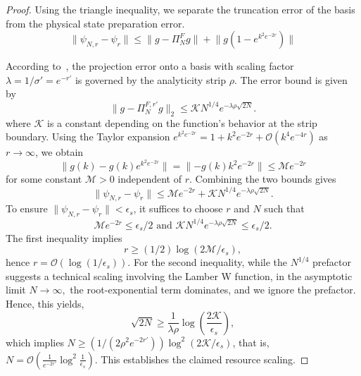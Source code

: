 \documentclass{article}
\begin{document}
\begin{proof}
    Using the triangle inequality, we separate the truncation error of the basis from the physical state preparation error.
    $$\lVert \psi_{N,r} -\psi_r\rVert\leq \lVert g - \Pi_N^F g\rVert + \lVert g(1- e^{k^2 e^{-2r}})\rVert$$
    
    According to~\cite[Thm.~3.8 \& Sec.~5.2]{wang2025convergenceanalysishermiteapproximations}, the projection error onto a basis with scaling factor $\lambda=1/\sigma'=e^{-r'}$ is governed by the analyticity strip $\rho$. The error bound is given by
    \[
    \lVert g - \Pi^{F,r'}_N g \rVert_2 \leq \mathcal{K} N^{1/4} e^{-\lambda\rho \sqrt{2N}}.
    \]
    where $\mathcal{K}$ is a constant depending on the function's behavior at the strip boundary. 
    Using the Taylor expansion $e^{k^2 e^{-2r}} = 1 + k^2 e^{-2r} + \mathcal O(k^4 e^{-4r})$ as $r\to\infty$, we obtain 
        $$\lVert g(k)-g(k)e^{k^2e^{-2r}}\rVert=\lVert-g(k)k^2e^{-2r}\rVert\leq\mathcal{M}e^{-2r}$$ 
    for some constant $\mathcal M > 0$ independent of $r$.
    Combining the two bounds gives $$\lVert \psi_{N,r} -\psi_r\rVert \leq \mathcal{M} e^{-2r} + \mathcal{K} N^{1/4}e^{-\lambda\rho \sqrt{2N}}.$$ 
    To ensure $\lVert \psi_{N,r} - \psi_r\rVert < \epsilon_s$, it suffices to choose $r$ and $N$ such that
        $$\mathcal{M} e^{-2r} \leq \epsilon_s/2 \text{ and } \mathcal{K} N^{1/4} e^{-\lambda\rho \sqrt{2N}} \leq \epsilon_s/2.$$
    The first inequality implies 
        $$r \geq (1/2)\log(2\mathcal M/\epsilon_s),$$ 
    hence $r = \mathcal O(\log(1/\epsilon_s))$. For the second inequality, while the $N^{1/4}$ prefactor suggests a technical scaling involving the Lamber W function, in the asymptotic limit $N\rightarrow\infty,$ the root-exponential term dominates, and we ignore the prefactor.  Hence, this yields, $$\sqrt{2N} \geq \frac{1}{\lambda\rho} \log\left(\frac{2\mathcal{K}}{\epsilon_s}\right),$$ which implies $N \geq (1/(2\rho^2e^{-2r'})) \log^2(2\mathcal{K}/\epsilon_s)$, that is,
     $N =\mathcal O\left(\frac{1}{e^{-2r'}}\log^2\frac{1}{\epsilon_s}\right)$. This establishes the claimed resource scaling.
\end{proof}
\end{document}
